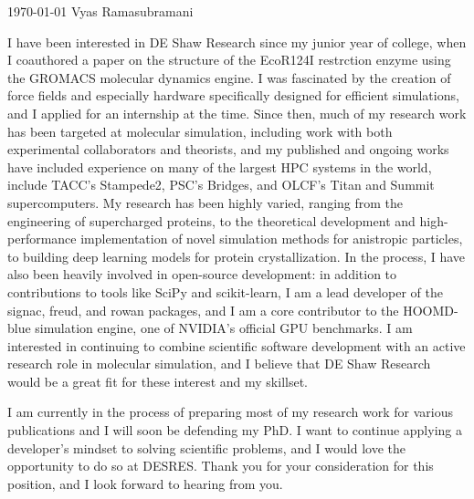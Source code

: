 \documentclass[11pt, a4paper]{awesome-cv}
\begin{document}
\makecvheader[R]

\makecvfooter
  {\today}
  {Vyas Ramasubramani}
  {}

\makelettertitle

\begin{cvletter}

    I have been interested in DE Shaw Research since my junior year of college, when I coauthored a paper on the structure of the EcoR124I restrction enzyme using the GROMACS molecular dynamics engine.
    I was fascinated by the creation of force fields and especially hardware specifically designed for efficient simulations, and I applied for an internship at the time.
    Since then, much of my research work has been targeted at molecular simulation, including work with both experimental collaborators and theorists, and my published and ongoing works have included experience on many of the largest HPC systems in the world, include TACC's Stampede2, PSC's Bridges, and OLCF's Titan and Summit supercomputers.
    My research has been highly varied, ranging from the engineering of supercharged proteins, to the theoretical development and high-performance implementation of novel simulation methods for anistropic particles, to building deep learning models for protein crystallization.
    In the process, I have also been heavily involved in open-source development: in addition to contributions to tools like SciPy and scikit-learn, I am a lead developer of the signac, freud, and rowan packages, and I am a core contributor to the HOOMD-blue simulation engine, one of NVIDIA's official GPU benchmarks.
    I am interested in continuing to combine scientific software development with an active research role in molecular simulation, and I believe that DE Shaw Research would be a great fit for these interest and my skillset.

    I am currently in the process of preparing most of my research work for various publications and I will soon be defending my PhD.
    I want to continue applying a developer's mindset to solving scientific problems, and I would love the opportunity to do so at DESRES.
    Thank you for your consideration for this position, and I look forward to hearing from you.
\end{cvletter}


\makeletterclosing
\end{document}
